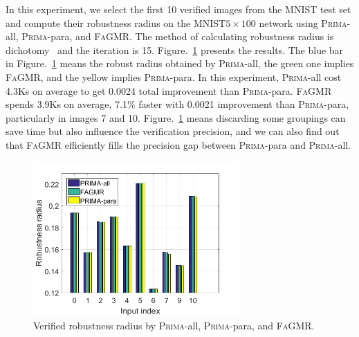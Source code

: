 \documentclass[runningheads]{llncs}
\newcommand{\ourtool}{\textsc{FaGMR}\xspace}
\newcommand{\prima}{\textsc{Prima}\xspace}
\newcommand{\mnist}{MNIST\xspace}
\begin{document}
In this experiment, we select the first 10 verified images from the \mnist test set
and compute their robustness radius on the \mnist $5\times100$ network using
\prima-all, \prima-para, and \ourtool.
The method of calculating robustness radius is dichotomy~\cite{DBLP:conf/cav/KatzBDJK17} and the iteration is 15.
Figure.~\ref{table2} presents the results.
The blue bar in Figure.~\ref{table2} means the robust radius obtained
by \prima-all, the green one implies \ourtool,
and the yellow implies \prima-para.
In this experiment, \prima-all cost 4.3Ks on average to get
0.0024 total improvement than \prima-para.
\ourtool spends 3.9Ks on average, 7.1\% faster with 0.0021 improvement
than \prima-para, particularly in images 7 and 10.
Figure.~\ref{table2} means discarding some groupings
 can save time but also influence the verification precision,
and we can also find out that \ourtool efficiently fills the precision gap between
\prima-para and \prima-all.
\begin{figure}
	\begin{center}
	\includegraphics[width=0.7\textwidth]{figures/FigR3_2.png}
	\caption{Verified robustness radius by \prima-all, \prima-para, and \ourtool.} \label{table2}
	\end{center}
\end{figure}
%
%
%
\end{document}
